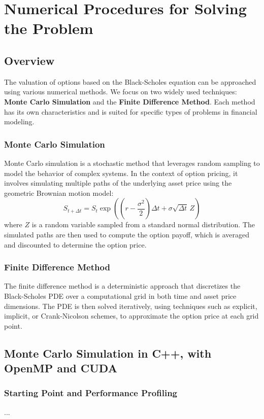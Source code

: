 \documentclass[12pt,a4paper]{report}
\begin{document}
\chapter{Numerical Procedures for Solving the Problem}

\section{Overview}
The valuation of options based on the Black-Scholes equation can be approached using various numerical methods. We focus on two widely used techniques: \textbf{Monte Carlo Simulation} and the \textbf{Finite Difference Method}. Each method has its own characteristics and is suited for specific types of problems in financial modeling.

\subsection{Monte Carlo Simulation}
Monte Carlo simulation is a stochastic method that leverages random sampling to model the behavior of complex systems. In the context of option pricing, it involves simulating multiple paths of the underlying asset price using the geometric Brownian motion model:
\[
S_{t+\Delta t} = S_t \exp \left( \left(r - \frac{\sigma^2}{2}\right)\Delta t + \sigma \sqrt{\Delta t} \, Z \right)
\]
where \(Z\) is a random variable sampled from a standard normal distribution. The simulated paths are then used to compute the option payoff, which is averaged and discounted to determine the option price.

\subsection{Finite Difference Method}
The finite difference method is a deterministic approach that discretizes the Black-Scholes PDE over a computational grid in both time and asset price dimensions. The PDE is then solved iteratively, using techniques such as explicit, implicit, or Crank-Nicolson schemes, to approximate the option price at each grid point.


\section{Monte Carlo Simulation in C++, with OpenMP and CUDA}

\subsection{Starting Point and Performance Profiling}
...
\end{document}
